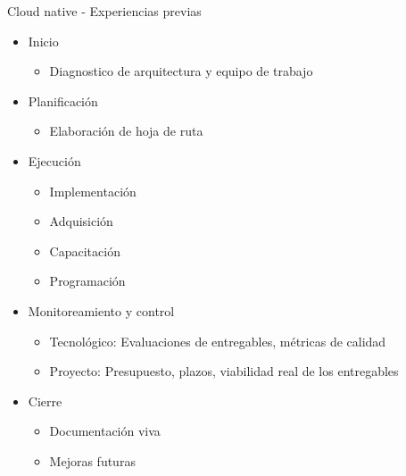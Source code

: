 \documentclass[aspectratio=169]{beamer}
\begin{document}
\begin{frame}{Cloud native - Experiencias previas}

	\begin{itemize}
    		\item Inicio
            	\begin{itemize}
                		\item Diagnostico de arquitectura y equipo de trabajo
                	\end{itemize}
    		\item Planificación
            	\begin{itemize}
                		\item Elaboración de hoja de ruta
                	\end{itemize}
            \item Ejecución
            	\begin{itemize}
                		\item Implementación
                		\item Adquisición
                        \item Capacitación
                        \item Programación
                	\end{itemize}
            \item Monitoreamiento y control
            	\begin{itemize}
                		\item Tecnológico: Evaluaciones de entregables, métricas de calidad
                        \item Proyecto: Presupuesto, plazos, viabilidad real de los entregables
                	\end{itemize}
    		\item Cierre
\begin{itemize}
                		\item Documentación viva
                        \item Mejoras futuras
                	\end{itemize}
    	\end{itemize}

\end{frame}
\end{document}
